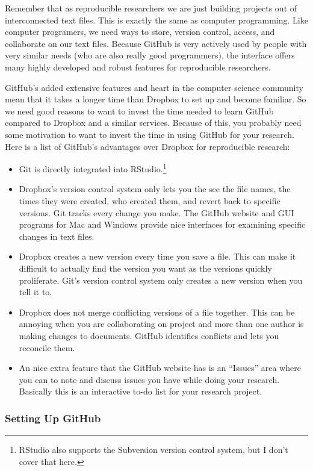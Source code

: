 Remember that as reproducible researchers we are just building projects out of interconnected text files. This is exactly the same as computer programming. Like computer programers, we need ways to
store, version control, access, and collaborate on our text files. Because GitHub is very actively used by people with very similar needs (who are also really good programmers), the interface offers many highly developed and robust features for reproducible researchers.

GitHub's added extensive features and heart in the computer science community mean that it takes a longer time than Dropbox to set up and become familiar. So we need good reasons to want to invest the time needed to learn GitHub compared to Dropbox and a similar services. Because of this, you probably need some motivation to want to invest the time in using GitHub for your research. Here is a list of GitHub's advantages over Dropbox for reproducible research:

\begin{itemize}
\item
  Git is directly integrated into RStudio.\footnote{RStudio also supports the Subversion version
  control system, but I don't cover that here.}
\item
  Dropbox's version control system only lets you the see the file names, the times they were created, who created them, and revert back to specific versions. Git tracks every change you make. The GitHub website and GUI programs for Mac and Windows provide nice interfaces for examining specific changes in text files.
\item
  Dropbox creates a new version every time you save a file. This can make it difficult to actually find the version you want as the versions quickly proliferate. Git's version control system only creates a new version when you tell it to.
\item
  Dropbox does not merge conflicting versions of a file together. This can be annoying when you are collaborating on project and more than one author is making changes to documents. GitHub identifies conflicts and lets you reconcile them.
\item
  An nice extra feature that the GitHub website has is an ``Issues'' area where you can to note and discuss issues you have while doing your research. Basically this is an interactive to-do list for your research project.
\end{itemize}

\subsubsection{Setting Up GitHub}

